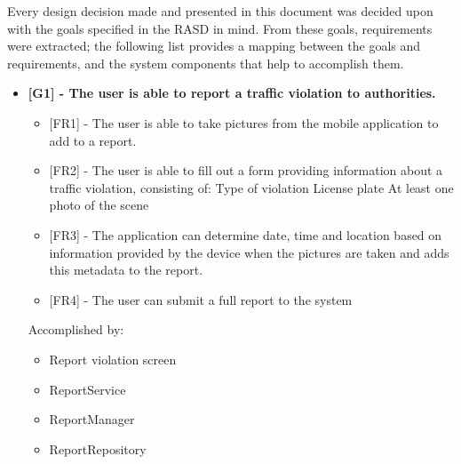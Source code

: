 Every design decision made and presented in this document was decided upon with the goals specified in the RASD in mind. From these goals, requirements were extracted; the following list provides a mapping between the goals and requirements, and the system components that help to accomplish them.\\

\begin{itemize}[label={}]
    \item \textbf{[G1] - The user is able to report a traffic violation to authorities.}
        \begin{itemize}[label={}]
            \item {[FR1]} - The user is able to take pictures from the mobile application to add to a report.
            \item {[FR2]} - The user is able to fill out a form providing information about a traffic violation, consisting of:
            Type of violation
            License plate
            At least one photo of the scene
            \item {[FR3]} - The application can determine date, time and location based on information provided by the device when the pictures are taken and adds this metadata to the report.
            \item {[FR4]} - The user can submit a full report to the system
        \end{itemize}
        Accomplished by:
        \begin{itemize}[label={\textbullet}]
            \item Report violation screen
            \item ReportService
            \item ReportManager
            \item ReportRepository
        \end{itemize}


\end{itemize}
